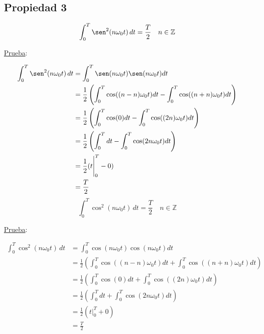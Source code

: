 \subsection*{Propiedad 3}
\begin{equation}
    \int_{0}^{T}\sen^2(n\omega_0 t)\,dt=\frac{T}{2}\quad n \in\mathbb{Z}
\end{equation}

\underline{Prueba}:

\begin{equation*}
\begin{split}
    \int_{0}^{T}\sen^2(n\omega_0 t)\,dt
        &=\int_{0}^{T}\sen(n\omega_0 t)\sen(n\omega_0 t)dt\\
        &=\frac{1}{2}\left(\int_{0}^{T}\cos((n-n)\omega_0 t)dt-
          \int_{0}^{T}\cos((n+n)\omega_0 t)dt\right)\\
        &=\frac{1}{2}\left(\int_{0}^{T}\cos(0)dt-
          \int_{0}^{T}\cos((2n)\omega_0 t)dt\right)\\
        &=\frac{1}{2}\left(\int_{0}^{T}dt-
          \int_{0}^{T}\cos(2n\omega_0 t)dt\right)\\
        &=\frac{1}{2}(t\Biggr|_0^T-0)\\
        &=\frac{T}{2}\\
\end{split}
\end{equation*}
\begin{equation}
    \int_{0}^{T}\cos^2(n\omega_0 t)\,dt=\frac{T}{2}\quad n \in\mathbb{Z}
\end{equation}

\underline{Prueba}:

\begin{equation*}
\begin{split}
    \int_{0}^{T}\cos^2(n\omega_0 t)\,dt
        &=\int_{0}^{T}\cos(n\omega_0 t)\cos(n\omega_0 t)dt\\
        &=\frac{1}{2}\left(\int_{0}^{T}\cos((n-n)\omega_0 t)dt+
          \int_{0}^{T}\cos((n+n)\omega_0 t)dt\right)\\
        &=\frac{1}{2}\left(\int_{0}^{T}\cos(0)dt+
          \int_{0}^{T}\cos((2n)\omega_0 t)dt\right)\\
        &=\frac{1}{2}\left(\int_{0}^{T}dt+
          \int_{0}^{T}\cos(2n\omega_0 t)dt\right)\\
        &=\frac{1}{2}(t\Biggr|_0^T+0)\\
        &=\frac{T}{2}\\
\end{split}
\end{equation*}

